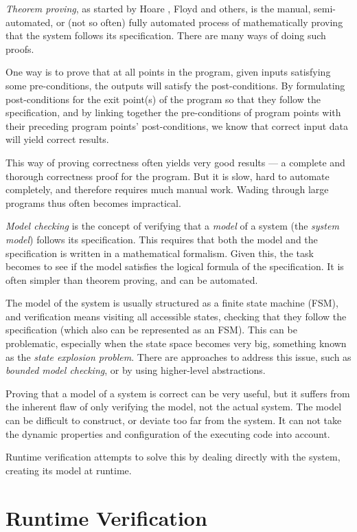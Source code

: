 \textit{Theorem proving}, as started by Hoare \cite{hoare69}, Floyd
\cite{floyd67} and others, is the manual, semi-automated, or (not so often)
fully automated process of mathematically proving that the system follows its
specification. There are many ways of doing such proofs.

One way is to prove that at all points in the program, given inputs satisfying
some pre-conditions, the outputs will satisfy the post-conditions. By
formulating post-conditions for the exit point(s) of the program so that they
follow the specification, and by linking together the pre-conditions of program
points with their preceding program points' post-conditions, we know that
correct input data will yield correct results.

This way of proving correctness often yields very good results --- a complete
and thorough correctness proof for the program. But it is slow, hard to
automate completely, and therefore requires much manual work.  Wading through
large programs thus often becomes impractical.

\textit{Model checking} is the concept of verifying that a \textit{model} of a
system (the \textit{system model}) follows its specification. This requires
that both the model and the specification is written in a mathematical
formalism. Given this, the task becomes to see if the model satisfies the
logical formula of the specification. It is often simpler than theorem proving,
and can be automated.

The model of the system is usually structured as a finite state machine (FSM),
and verification means visiting all accessible states, checking that they
follow the specification (which also can be represented as an FSM). This can be
problematic, especially when the state space becomes very big, something known
as the \textit{state explosion problem}. There are approaches to address this
issue, such as \textit{bounded model checking}, or by using higher-level
abstractions.

Proving that a model of a system is correct can be very useful, but it suffers
from the inherent flaw of only verifying the model, not the actual system. The
model can be difficult to construct, or deviate too far from the system. It can
not take the dynamic properties and configuration of the executing code into
account.

Runtime verification attempts to solve this by dealing directly with the
system, creating its model at runtime.


\section{Runtime Verification} \label{section-rv}

